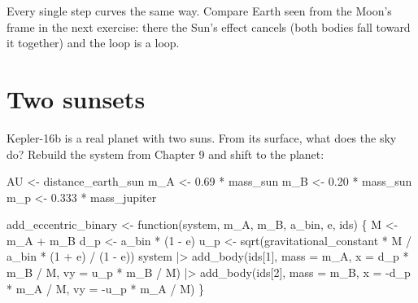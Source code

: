 \documentclass[
  10.5pt,
  letterpaper,
]{scrbook}
\newenvironment{Shaded}{\begin{snugshade}}{\end{snugshade}}
\newcommand{\AttributeTok}[1]{\textcolor[rgb]{0.00,0.00,0.00}{#1}}
\newcommand{\ControlFlowTok}[1]{\textcolor[rgb]{0.00,0.00,0.00}{#1}}
\newcommand{\DecValTok}[1]{\textcolor[rgb]{0.00,0.00,0.00}{#1}}
\newcommand{\FloatTok}[1]{\textcolor[rgb]{0.00,0.00,0.00}{#1}}
\newcommand{\FunctionTok}[1]{\textcolor[rgb]{0.00,0.00,0.00}{#1}}
\newcommand{\NormalTok}[1]{\textcolor[rgb]{0.00,0.00,0.00}{#1}}
\newcommand{\OtherTok}[1]{\textcolor[rgb]{0.00,0.00,0.00}{#1}}
\newcommand{\SpecialCharTok}[1]{\textcolor[rgb]{0.00,0.00,0.00}{#1}}
\theoremstyle{definition}
\theoremstyle{plain}
\theoremstyle{remark}
\begin{document}
Every single step curves the same way. Compare Earth seen from the
Moon's frame in the next exercise: there the Sun's effect cancels (both
bodies fall toward it together) and the loop is a loop.

\section{Two sunsets}\label{two-sunsets}

Kepler-16b is a real planet with two suns. From its surface, what does
the sky do? Rebuild the system from Chapter 9 and shift to the planet:

\begin{Shaded}
\begin{Highlighting}[]
\NormalTok{AU  }\OtherTok{\textless{}{-}}\NormalTok{ distance\_earth\_sun}
\NormalTok{m\_A }\OtherTok{\textless{}{-}} \FloatTok{0.69} \SpecialCharTok{*}\NormalTok{ mass\_sun}
\NormalTok{m\_B }\OtherTok{\textless{}{-}} \FloatTok{0.20} \SpecialCharTok{*}\NormalTok{ mass\_sun}
\NormalTok{m\_p }\OtherTok{\textless{}{-}} \FloatTok{0.333} \SpecialCharTok{*}\NormalTok{ mass\_jupiter}

\NormalTok{add\_eccentric\_binary }\OtherTok{\textless{}{-}} \ControlFlowTok{function}\NormalTok{(system, m\_A, m\_B, a\_bin, e, ids) \{}
\NormalTok{  M   }\OtherTok{\textless{}{-}}\NormalTok{ m\_A }\SpecialCharTok{+}\NormalTok{ m\_B}
\NormalTok{  d\_p }\OtherTok{\textless{}{-}}\NormalTok{ a\_bin }\SpecialCharTok{*}\NormalTok{ (}\DecValTok{1} \SpecialCharTok{{-}}\NormalTok{ e)}
\NormalTok{  u\_p }\OtherTok{\textless{}{-}} \FunctionTok{sqrt}\NormalTok{(gravitational\_constant }\SpecialCharTok{*}\NormalTok{ M }\SpecialCharTok{/}\NormalTok{ a\_bin }\SpecialCharTok{*}\NormalTok{ (}\DecValTok{1} \SpecialCharTok{+}\NormalTok{ e) }\SpecialCharTok{/}\NormalTok{ (}\DecValTok{1} \SpecialCharTok{{-}}\NormalTok{ e))}
\NormalTok{  system }\SpecialCharTok{|\textgreater{}}
    \FunctionTok{add\_body}\NormalTok{(ids[}\DecValTok{1}\NormalTok{], }\AttributeTok{mass =}\NormalTok{ m\_A, }\AttributeTok{x =}\NormalTok{  d\_p }\SpecialCharTok{*}\NormalTok{ m\_B }\SpecialCharTok{/}\NormalTok{ M, }\AttributeTok{vy =}\NormalTok{  u\_p }\SpecialCharTok{*}\NormalTok{ m\_B }\SpecialCharTok{/}\NormalTok{ M) }\SpecialCharTok{|\textgreater{}}
    \FunctionTok{add\_body}\NormalTok{(ids[}\DecValTok{2}\NormalTok{], }\AttributeTok{mass =}\NormalTok{ m\_B, }\AttributeTok{x =} \SpecialCharTok{{-}}\NormalTok{d\_p }\SpecialCharTok{*}\NormalTok{ m\_A }\SpecialCharTok{/}\NormalTok{ M, }\AttributeTok{vy =} \SpecialCharTok{{-}}\NormalTok{u\_p }\SpecialCharTok{*}\NormalTok{ m\_A }\SpecialCharTok{/}\NormalTok{ M)}
\NormalTok{\}}


\end{Highlighting}
\end{Shaded}
\end{document}
